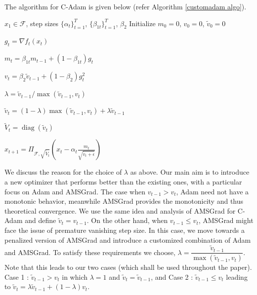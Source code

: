 \documentclass[12pt]{article}
\begin{document}
The algorithm for C-Adam is given below (refer Algorithm \ref{customadam algo}).\\

\begin{algorithm}
\caption{C-Adam}
\label{customadam algo}
\begin{algorithmic}[1]

\Require$x_1 \in \mathcal{F}$, step sizes $\{\alpha_t\}_{t=1}^{T}$, 
$\{\beta_{1t}\}_{t=1}^{T}$, $\beta_2$
\State Initialize $m_0 = 0$, $v_0 = 0$, $\tilde{v}_0 = 0$

    \Statex $g_t = \nabla f_t(x_t)$
    
    \Statex $m_t = \beta_{1t} m_{t-1} + (1 - \beta_{1t}) g_t$

    \Statex $v_t = \beta_2 \tilde{v}_{t-1} + (1 - \beta_2) g_t^2$

    \Statex $\lambda = \tilde{v}_{t-1} / \max(\tilde{v}_{t-1}, v_t)$

    \Statex $\tilde{v}_t = (1-\lambda)\max(\tilde{v}_{t-1}, v_t) + \lambda\tilde{v}_{t-1}$
    
    \Statex $\tilde{V}_t = \operatorname{diag}(\tilde{v}_t)$
    
    \Statex $x_{t+1} = \Pi_{\mathcal{F}, \sqrt{\tilde{V}_t}}
    \left(x_t - \alpha_t \frac{m_t}{\sqrt{\tilde{v}_t+\epsilon}} \right)$
\EndFor{}
\end{algorithmic}
\end{algorithm}

We discuss the reason for the choice of $\lambda$ as above. Our main aim is to introduce a new optimizer that performs better than the existing ones, with a particular focus on Adam and AMSGrad. The case when $v_{t-1} > v_{t}$, Adam need not have a monotonic behavior, meanwhile AMSGrad provides the monotonicity and thus theoretical convergence. We use the same idea and analysis of AMSGrad for C-Adam and define $\tilde{v}_t = v_{t-1}$. On the other hand, when $v_{t-1} \leq v_{t}$, AMSGrad might face the issue of premature vanishing step size. In this case, we move towards a penalized version of AMSGrad and introduce a customized combination of Adam and AMSGrad. To satisfy these requirements we choose, $\lambda = \dfrac{\tilde{v}_{t-1}}{\max(\tilde{v}_{t-1}, v_{t})}$. Note that this leads to our two cases (which shall be used throughout the paper). Case 1 : $\tilde{v}_{t-1} > v_{t}$ in which $\lambda=1$ and $\tilde{v}_t=\tilde{v}_{t-1}$, and Case 2 : $\tilde{v}_{t-1} \leq v_{t}$ leading to $\tilde{v}_t=\lambda \tilde{v}_{t-1}+(1-\lambda)v_t$.
\end{document}
